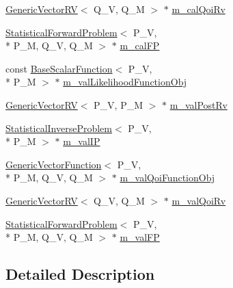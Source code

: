 \begin{DoxyCompactItemize}
\item 
\hyperlink{class_q_u_e_s_o_1_1_generic_vector_r_v}{Generic\-Vector\-R\-V}$<$ Q\-\_\-\-V, Q\-\_\-\-M $>$ $\ast$ \hyperlink{class_q_u_e_s_o_1_1_validation_cycle_ac3bac139c827b3210e92d4bac190f89f}{m\-\_\-cal\-Qoi\-Rv}
\item 
\hyperlink{class_q_u_e_s_o_1_1_statistical_forward_problem}{Statistical\-Forward\-Problem}$<$ P\-\_\-\-V, \\*
P\-\_\-\-M, Q\-\_\-\-V, Q\-\_\-\-M $>$ $\ast$ \hyperlink{class_q_u_e_s_o_1_1_validation_cycle_ab91bdb2d36652abb6275af640f2844bd}{m\-\_\-cal\-F\-P}
\item 
const \hyperlink{class_q_u_e_s_o_1_1_base_scalar_function}{Base\-Scalar\-Function}$<$ P\-\_\-\-V, \\*
P\-\_\-\-M $>$ $\ast$ \hyperlink{class_q_u_e_s_o_1_1_validation_cycle_a18afcde29c5ba9f4b7d9db9519166d45}{m\-\_\-val\-Likelihood\-Function\-Obj}
\item 
\hyperlink{class_q_u_e_s_o_1_1_generic_vector_r_v}{Generic\-Vector\-R\-V}$<$ P\-\_\-\-V, P\-\_\-\-M $>$ $\ast$ \hyperlink{class_q_u_e_s_o_1_1_validation_cycle_a196610836330a456a21c4f3b6ec56883}{m\-\_\-val\-Post\-Rv}
\item 
\hyperlink{class_q_u_e_s_o_1_1_statistical_inverse_problem}{Statistical\-Inverse\-Problem}$<$ P\-\_\-\-V, \\*
P\-\_\-\-M $>$ $\ast$ \hyperlink{class_q_u_e_s_o_1_1_validation_cycle_ad65609930305ca35305bb7b42b1acfad}{m\-\_\-val\-I\-P}
\item 
\hyperlink{class_q_u_e_s_o_1_1_generic_vector_function}{Generic\-Vector\-Function}$<$ P\-\_\-\-V, \\*
P\-\_\-\-M, Q\-\_\-\-V, Q\-\_\-\-M $>$ $\ast$ \hyperlink{class_q_u_e_s_o_1_1_validation_cycle_a35443093bebe1ddbab7fa7cb671be562}{m\-\_\-val\-Qoi\-Function\-Obj}
\item 
\hyperlink{class_q_u_e_s_o_1_1_generic_vector_r_v}{Generic\-Vector\-R\-V}$<$ Q\-\_\-\-V, Q\-\_\-\-M $>$ $\ast$ \hyperlink{class_q_u_e_s_o_1_1_validation_cycle_a930f8140c5ba8655ea6ce926acc6ceef}{m\-\_\-val\-Qoi\-Rv}
\item 
\hyperlink{class_q_u_e_s_o_1_1_statistical_forward_problem}{Statistical\-Forward\-Problem}$<$ P\-\_\-\-V, \\*
P\-\_\-\-M, Q\-\_\-\-V, Q\-\_\-\-M $>$ $\ast$ \hyperlink{class_q_u_e_s_o_1_1_validation_cycle_ac1ba4bc21405b92f9bce23e8579e5c70}{m\-\_\-val\-F\-P}
\end{DoxyCompactItemize}


\subsection{Detailed Description}

